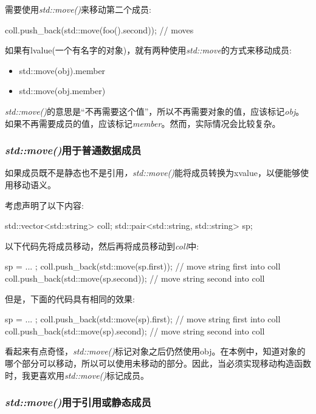 需要使用\textit{std::move()}来移动第二个成员:

\begin{cppcode}
coll.push_back(std::move(foo().second)); // moves
\end{cppcode}

如果有lvalue(一个有名字的对象)，就有两种使用\textit{std::move}的方式来移动成员:

\begin{itemize}
	\item std::move(obj).member
	\item std::move(obj.member)
\end{itemize}

\textit{std::move()}的意思是“不再需要这个值”，所以不再需要对象的值，应该标记\textit{obj}。如果不再需要成员的值，应该标记\textit{member}。然而，实际情况会比较复杂。

\subsubsection{\textit{std::move()}用于普通数据成员}

如果成员既不是静态也不是引用\textit{，std::move()}能将成员转换为xvalue，以便能够使用移动语义。

考虑声明了以下内容:

\begin{cppcode}
std::vector<std::string> coll;
std::pair<std::string, std::string> sp;
\end{cppcode}

以下代码先将成员移动，然后再将成员移动到\textit{coll}中:

\begin{cppcode}
sp = ... ;
coll.push_back(std::move(sp.first)); // move string first into coll
coll.push_back(std::move(sp.second)); // move string second into coll
\end{cppcode}

但是，下面的代码具有相同的效果:

\begin{cppcode}
sp = ... ;
coll.push_back(std::move(sp).first); // move string first into coll
coll.push_back(std::move(sp).second); // move string second into coll
\end{cppcode}

看起来有点奇怪，\textit{std::move()}标记对象之后仍然使用obj。在本例中，知道对象的哪个部分可以移动，所以可以使用未移动的部分。因此，当必须实现移动构造函数时，我更喜欢用\textit{std::move()}标记成员。

\subsubsection{\textit{std::move()}用于引用或静态成员}

